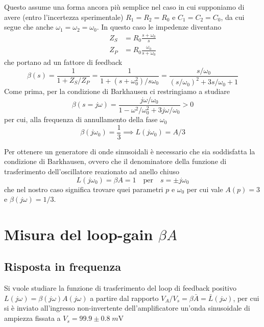 \documentclass[10pt, a4paper, italian]{article}
\begin{document}
Questo assume una forma ancora più semplice nel caso in cui supponiamo di avere
(entro l'incertezza sperimentale) $R_1 = R_2 = R_0$ e $C_1 = C_2 = C_0$,
da cui segue che anche $\omega_1 = \omega_2 = \omega_0$. In questo caso le
impedenze diventano
\begin{align*}
Z_S &= R_0 \frac{s + \omega_0}{s} \\
Z_P &= R_0 \frac{\omega_0}{s + \omega_0}
\end{align*}
che portano ad un fattore di feedback
\begin{equation}
\beta(s) = \frac{1}{1 + Z_S/Z_P} =
\frac{1}{1 + (s + \omega_0^2)/s \omega_0} =
\frac{s/\omega_0}{(s/\omega_0)^2 + 3s/\omega_0 + 1}
\end{equation}
Come prima, per la condizione di Barkhausen ci restringiamo a studiare
\[
\beta(s = j \omega) = 
\frac{j \omega/\omega_0}{1 - \omega^2/\omega_0^2 + 3j \omega/\omega_0} > 0
\]
per cui, alla frequenza di annullamento della fase $\omega_0$
\begin{equation}\label{eq: loop-gain-approx}
\beta(j \omega_0) = \frac{1}{3} \implies L(j \omega_0) = A/3
\end{equation}

Per ottenere un generatore di onde sinusoidali è necessario che sia
soddisfatta la condizione di Barkhausen, ovvero che il denominatore della
funzione di trasferimento dell'oscillatore reazionato ad anello chiuso
\[
L(j \omega_0) = \beta A = 1 \quad \text{per} \quad s = \pm j \omega_0
\]
che nel nostro caso significa trovare quei parametri $p$ e $\omega_0$ per cui
vale $A(p) = 3$ e $\beta(j\omega) = 1/3$.

\section{Misura del loop-gain $\beta A$}

\subsection{Risposta in frequenza}
Si vuole studiare la funzione di trasferimento del loop di feedback positivo
$L(j\omega) = \beta(j\omega) A(j\omega)$ a partire dal rapporto
$V_A/V_s = \beta \bar{A} = \bar{L}(j\omega)$, per cui si è
inviato all'ingresso non-invertente dell'amplificatore un'onda sinusoidale
di ampiezza fissata a $V_s = 99.9 \pm 0.8 \; \si{m\V}$
\end{document}
